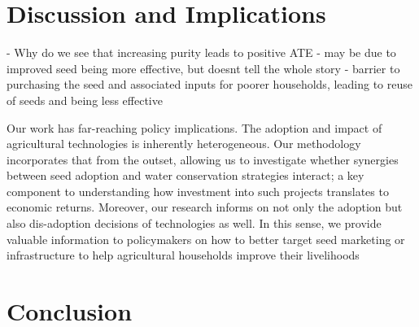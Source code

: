 \documentclass{article}
\begin{document}



\section{Discussion and Implications}

- Why do we see that increasing purity leads to positive ATE
- may be due to improved seed being more effective, but doesnt tell the whole story
- barrier to purchasing the seed and associated inputs for poorer households, leading to reuse of seeds and being less effective


Our work has far-reaching policy implications. The adoption and impact of agricultural technologies is inherently heterogeneous. Our methodology incorporates that from the outset, allowing us to investigate whether synergies between seed adoption and water conservation strategies interact; a key component to understanding how investment into such projects translates to economic returns. Moreover, our research informs on not only the adoption but also dis-adoption decisions of technologies as well. In this sense, we provide valuable information to policymakers on how to better target seed marketing or infrastructure to help agricultural households improve their livelihoods


\section{Conclusion}



\end{document}
